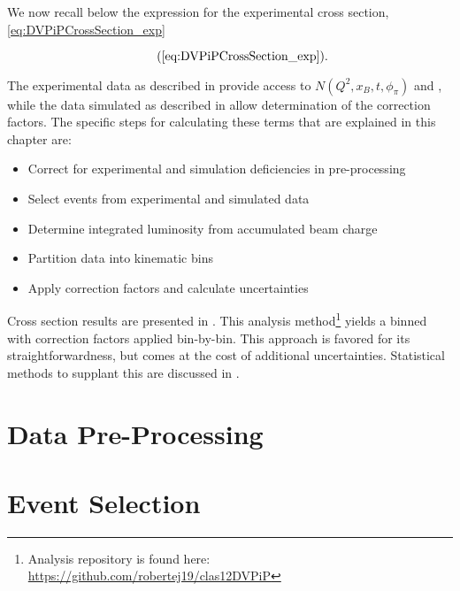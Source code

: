 We now recall below the expression for the experimental cross section, \eqref{eq:DVPiPCrossSection_exp}

        \begin{equation*}
          \recallLabel{eq:DVPiPCrossSection_exp}.
        \end{equation*}

The experimental data as described in  provide access to $N(Q^2,x_B,t,\phi_{\pi})$ and \Lumiint, while the data simulated as described in  allow determination of the correction factors. The specific steps for calculating these terms that are explained in this chapter are: 


\begin{itemize}
  \item Correct for experimental and simulation deficiencies in pre-processing 
  \item Select \dvpip events from experimental and simulated data 
  \item Determine integrated luminosity from accumulated beam charge 
  \item Partition data into kinematic bins 
  \item Apply correction factors and calculate uncertainties 
\end{itemize}

Cross section results are presented in . This analysis method\footnote{Analysis repository is found here:  \href{https://github.com/robertej19/clas12DVPiP}{https://github.com/robertej19/clas12DVPiP}}
  yields a binned \xsec with correction factors applied bin-by-bin. This approach is favored for its straightforwardness, but comes at the cost of additional uncertainties. Statistical methods to supplant this are discussed in . 


\section{Data Pre-Processing}\label{sec:Ch4_data_preprocess}
    
    \clearpage
    
\section{Event Selection}\label{sec:Ch4_event_selection}
    
    \clearpage
    
